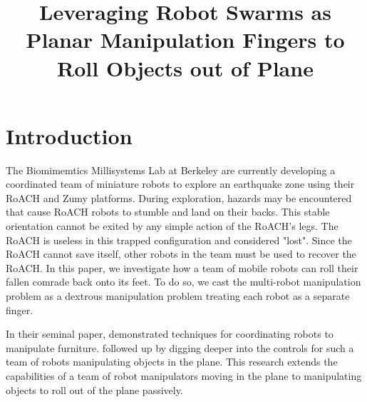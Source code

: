 \documentclass[conference]{IEEEtran}
\begin{document}
\title{Leveraging Robot Swarms as Planar Manipulation Fingers to Roll Objects out of Plane}

\author{
\and
{}
}


\maketitle

\begin{abstract}


\end{abstract}


\IEEEpeerreviewmaketitle

\section{Introduction}
The Biomimemtics Millisystems Lab at Berkeley are currently developing a coordinated team of miniature robots to explore an earthquake zone using their RoACH and Zumy platforms. During exploration, hazards may be encountered that cause RoACH robots to stumble and land on their backs. This stable orientation cannot be exited by any simple action of the RoACH's legs. The RoACH is useless in this trapped configuration and considered "lost". Since the RoACH cannot save itself, other robots in the team must be used to recover the RoACH. In this paper, we investigate how a team of mobile robots can roll their fallen comrade back onto its feet. To do so, we cast the multi-robot manipulation problem as a dextrous manipulation problem treating each robot as a separate finger.

In their seminal paper, \citet{rus1995moving} demonstrated techniques for coordinating robots to manipulate furniture.
\citet{sugar2002control} followed up by digging deeper into the controls for such a team of robots manipulating objects in the plane.
This research extends the capabilities of a team of robot manipulators moving in the plane to manipulating objects to roll out of the plane passively.
\end{document}
